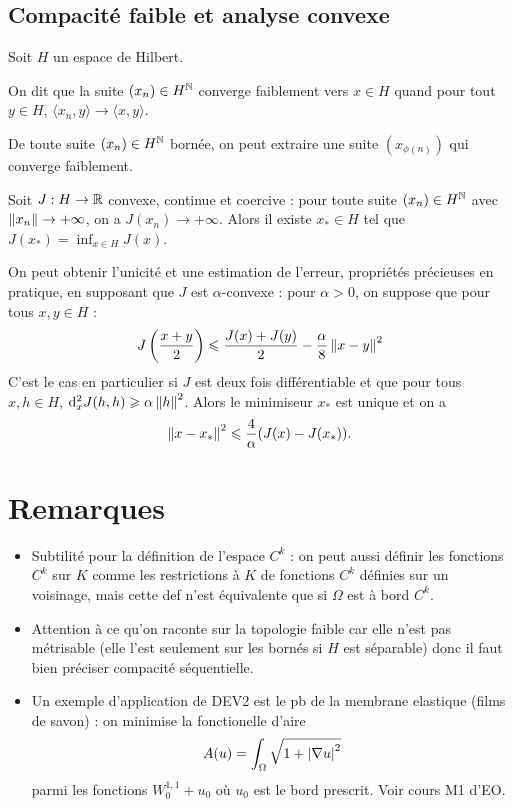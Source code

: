 \documentclass[twocolumn, landscape]{article}
\begin{document}
\subsection{Compacité faible et analyse convexe \cite{Allaire}}

Soit $H$ un espace de Hilbert.

\begin{defi}
    On dit que la suite $(x_n) \in H^{\mathbb{N}}$ converge faiblement vers $x\in H$ quand pour tout $y \in H$, $\langle x_n, y \rangle \to \langle x, y \rangle$.
\end{defi}

\begin{theo}
    De toute suite $(x_n) \in H^{\mathbb{N}}$ bornée, on peut extraire une suite $(x_{\phi(n)})$ qui converge faiblement. 
\end{theo}

\begin{coro}
    Soit $J : H \to \mathbb{R}$ convexe, continue et coercive : pour toute suite $(x_n) \in H^{\mathbb{N}}$ avec $\left\lVert x_n \right\rVert \to +\infty$, on a $J(x_n) \to +\infty$. Alors il existe $x_* \in H$ tel que $J(x_*) = \inf_{x \in H} J(x).$
\end{coro}

\begin{rema}
    On peut obtenir l'unicité et une estimation de l'erreur, propriétés précieuses en pratique, en supposant que $J$ est $\alpha$-convexe : pour $\alpha > 0$, on suppose que pour tous $x,y \in H$ : $$J\left( \frac{x+y}{2} \right) \leqslant \frac{J(x) + J(y)}{2} - \frac{\alpha}{8} \left\lVert x - y \right\rVert^2$$
    C'est le cas en particulier si $J$ est deux fois différentiable et que pour tous $x, h \in H$, $\mathrm{d}^2_xJ(h,h) \geqslant \alpha \left\lVert h \right\rVert^2$.
    Alors le minimiseur $x_*$ est unique et on a $$\left\lVert x - x_* \right\rVert^2 \leqslant \frac{4}{\alpha}(J(x) - J(x_*)).$$
\end{rema}

\newpage

\printbibliography

\section*{Remarques}

\begin{itemize}
    \item Subtilité pour la définition de l'espace $C^k$ : on peut aussi définir les fonctions $C^k$ sur $K$ comme les restrictions à $K$ de fonctions $C^k$ définies sur un voisinage, mais cette def n'est équivalente que si $\Omega$ est à bord $C^k$. 
    \item Attention à ce qu'on raconte sur la topologie faible car elle n'est pas métrisable (elle l'est seulement sur les bornés si $H$ est séparable) donc il faut bien préciser compacité séquentielle. 
    \item Un exemple d'application de DEV2 est le pb de la membrane elastique (films de savon) : on minimise la fonctionelle d'aire $$A(u) = \int_{\Omega} \sqrt{1+ \left\lvert \nabla u \right\rvert^2}$$
    parmi les fonctions $W^{1,1}_0 + u_0$ où $u_0$ est le bord prescrit. Voir cours M1 d'EO.
\end{itemize}
\end{document}
